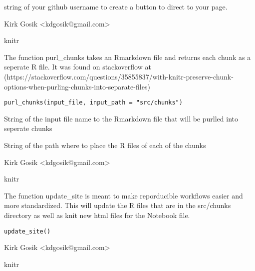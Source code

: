 \documentclass[letterpaper]{book}
\begin{document}
%
\begin{Arguments}
\begin{ldescription}
\item[\code{github\_username}] string of your github username to create a button to direct to your page.
\end{ldescription}
\end{Arguments}
%
\begin{Author}\relax
Kirk Gosik <kdgosik@gmail.com>
\end{Author}
%
\begin{SeeAlso}\relax
knitr
\end{SeeAlso}
%
\begin{Description}\relax
The function purl\_chunks takes an Rmarkdown file and returns each chunk as a
seperate R file.  It was found on stackoverflow at
(https://stackoverflow.com/questions/35855837/with-knitr-preserve-chunk-options-when-purling-chunks-into-separate-files)
\end{Description}
%
\begin{Usage}
\begin{verbatim}
purl_chunks(input_file, input_path = "src/chunks")
\end{verbatim}
\end{Usage}
%
\begin{Arguments}
\begin{ldescription}
\item[\code{input\_file}] String of the input file name to the Rmarkdown file that will be purlled into seperate chunks

\item[\code{input\_path}] String of the path where to place the R files of each of the chunks
\end{ldescription}
\end{Arguments}
%
\begin{Author}\relax
Kirk Gosik <kdgosik@gmail.com>
\end{Author}
%
\begin{SeeAlso}\relax
knitr
\end{SeeAlso}
%
\begin{Description}\relax
The function update\_site is meant to make reporducible workflows easier and more standardized.  This will
update the R files that are in the src/chunks directory as well as knit new html files for the Notebook file.
\end{Description}
%
\begin{Usage}
\begin{verbatim}
update_site()
\end{verbatim}
\end{Usage}
%
\begin{Author}\relax
Kirk Gosik <kdgosik@gmail.com>
\end{Author}
%
\begin{SeeAlso}\relax
knitr
\end{SeeAlso}
\printindex{}
\end{document}
